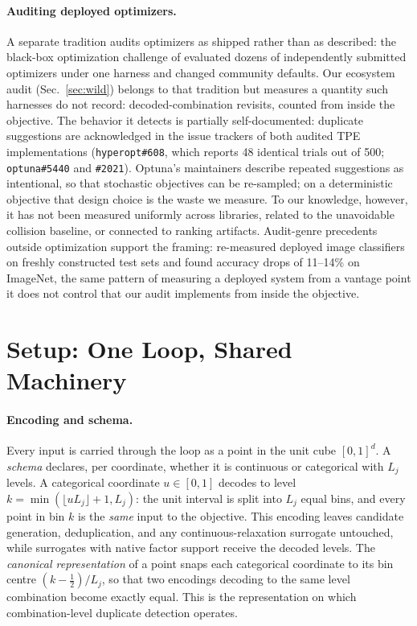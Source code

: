 \documentclass[%
 aip,
 amsmath,amssymb,
 floatfix,
 reprint,%
]{revtex4-1}
\begin{document}
\paragraph{Auditing deployed optimizers.}
A separate tradition audits optimizers as shipped rather than as
described: the black-box optimization challenge of
\citet{turner2021bayesian} evaluated dozens of independently submitted
optimizers under one harness and changed community defaults. Our
ecosystem audit (Sec.~\ref{sec:wild}) belongs to that tradition but
measures a quantity such harnesses do not record: decoded-combination
revisits, counted from inside the objective. The behavior it detects is
partially self-documented: duplicate suggestions are acknowledged in
the issue trackers of both audited TPE implementations
(\texttt{hyperopt\#608}, which reports 48 identical trials out of 500;
\texttt{optuna\#5440} and \texttt{\#2021}). Optuna's maintainers describe
repeated suggestions as intentional, so that stochastic objectives can be
re-sampled; on a deterministic objective that design choice is the waste we
measure. To our knowledge, however,
it has not been measured uniformly across libraries, related to the
unavoidable collision baseline, or connected to ranking artifacts.
Audit-genre precedents outside optimization support the framing:
\citet{recht2019imagenet} re-measured deployed image classifiers on
freshly constructed test sets and found accuracy drops of 11--14\% on
ImageNet, the same pattern of measuring a deployed system from a vantage
point it does not control that our audit implements from inside the
objective.

\section{Setup: One Loop, Shared Machinery}
\label{sec:setup}

\paragraph{Encoding and schema.}
Every input is carried through the loop as a point in the unit cube
$[0,1]^d$. A \emph{schema} declares, per coordinate, whether it is
continuous or categorical with $L_j$ levels. A categorical coordinate
$u \in [0,1]$ decodes to level $k = \min(\lfloor u L_j \rfloor + 1, L_j)$:
the unit interval is split into $L_j$ equal bins, and every point in bin
$k$ is the \emph{same} input to the objective. This encoding leaves
candidate generation, deduplication, and any continuous-relaxation
surrogate untouched, while surrogates with native factor support receive
the decoded levels. The \emph{canonical representation} of a point snaps
each categorical coordinate to its bin centre $(k - \tfrac12)/L_j$, so
that two encodings decoding to the same level combination become exactly
equal. This is the representation on which combination-level duplicate
detection operates.
\end{document}

